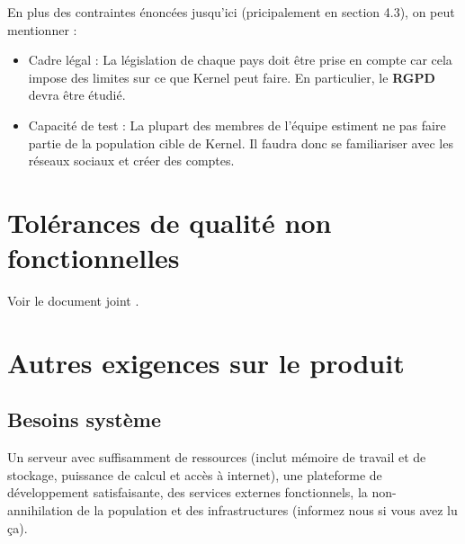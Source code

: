\documentclass[11pt]{article}
\begin{document}
En plus des contraintes énoncées jusqu'ici (pricipalement en section 4.3), on peut mentionner :
\begin{itemize}
	\item Cadre légal : La législation de chaque pays doit être prise en compte car cela impose des limites sur ce que Kernel peut faire. En particulier, le \textbf{RGPD} devra être étudié.
	
	\item Capacité de test : La plupart des membres de l'équipe estiment ne pas faire partie de la population cible de Kernel. Il faudra donc se familiariser avec les réseaux sociaux et créer des comptes.
\end{itemize}


\section{Tolérances de qualité non fonctionnelles}


Voir le document joint .




\section{Autres exigences sur le produit}

%
%
%
\subsection{Besoins système}

Un serveur avec suffisamment de ressources (inclut mémoire de travail et de stockage, puissance de calcul et accès à internet), une plateforme de développement satisfaisante, des services externes fonctionnels, la non-annihilation de la population et des infrastructures (informez nous si vous avez lu ça).
\end{document}
